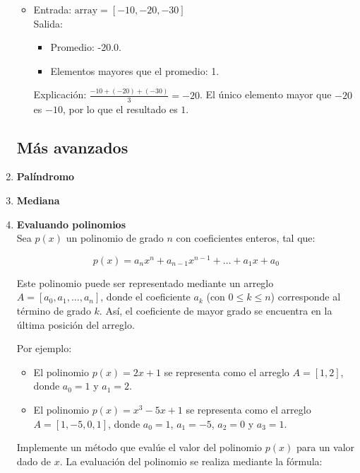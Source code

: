 \begin{enumerate}
\begin{itemize}
        \item Entrada: \( \text{array} = [-10, -20, -30] \)\\
        Salida: 
        \begin{itemize}
            \item Promedio: -20.0.
            \item Elementos mayores que el promedio: 1.
        \end{itemize}
        Explicación: \(\frac{-10 + (-20) + (-30)}{3} = -20\).  
        El único elemento mayor que \( -20 \) es \( -10 \), por lo que el resultado es \( 1 \).
    \end{itemize}

    
\subsection*{Más avanzados}
    \item \textbf{Palíndromo}
    

    \item \textbf{Mediana}\\
    

    \item \textbf{Evaluando polinomios}\\
    Sea \( p(x) \) un polinomio de grado \( n \) con coeficientes enteros, tal que:
    
    \[
    p(x) = a_n x^n + a_{n-1} x^{n-1} + \dots + a_1 x + a_0
    \]
    
    Este polinomio puede ser representado mediante un arreglo \( A = [a_0, a_1, \dots, a_n] \), donde el coeficiente \( a_k \) (con \( 0 \leq k \leq n \)) corresponde al término de grado \( k \). Así, el coeficiente de mayor grado se encuentra en la última posición del arreglo.
    
    Por ejemplo:
    
    \begin{itemize}
        \item El polinomio \( p(x) = 2x + 1 \) se representa como el arreglo \( A = [1, 2] \), donde \( a_0 = 1 \) y \( a_1 = 2 \).
        \item El polinomio \( p(x) = x^3 - 5x + 1 \) se representa como el arreglo \( A = [1, -5, 0, 1] \), donde \( a_0 = 1 \), \( a_1 = -5 \), \( a_2 = 0 \) y \( a_3 = 1 \).
    \end{itemize}
    
    Implemente un método que evalúe el valor del polinomio \( p(x) \) para un valor dado de \( x \). La evaluación del polinomio se realiza mediante la fórmula:
    

\end{enumerate}
